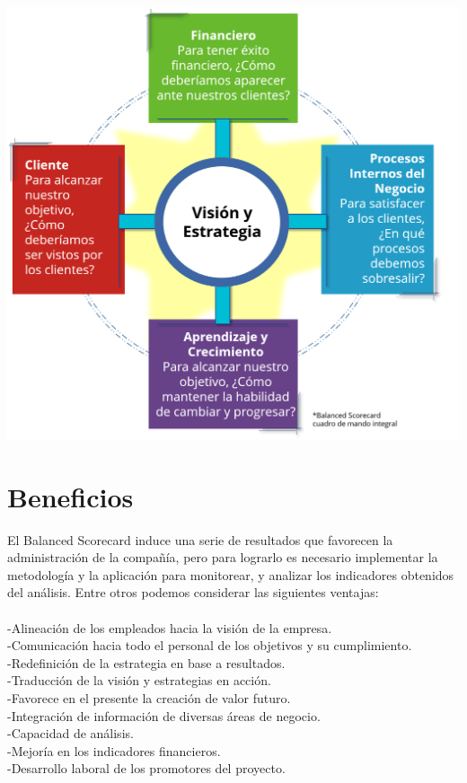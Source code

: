 \begin{center}
\includegraphics[width=15cm]{./Imagenes/imagen2}
\end{center}

\section{Beneficios}
\item{El Balanced Scorecard induce una serie de resultados que favorecen la administración de la compañía, pero para lograrlo es necesario implementar la metodología y la aplicación para monitorear, y analizar los indicadores obtenidos del análisis. Entre otros podemos considerar las siguientes ventajas:\\\\
-Alineación de los empleados hacia la visión de la empresa.\\
-Comunicación hacia todo el personal de los objetivos y su cumplimiento.\\
-Redefinición de la estrategia en base a resultados.\\
-Traducción de la visión y estrategias en acción.\\
-Favorece en el presente la creación de valor futuro.\\
-Integración de información de diversas áreas de negocio.\\
-Capacidad de análisis.\\
-Mejoría en los indicadores financieros.\\
-Desarrollo laboral de los promotores del proyecto.}

